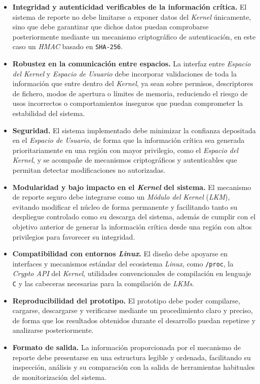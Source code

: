 \begin{itemize}
    \item \textbf{Integridad y autenticidad verificables de la información crítica.} El sistema de reporte no debe limitarse a exponer datos del \textit{Kernel} únicamente, sino que debe garantizar que dichos datos puedan comprobarse posteriormente mediante un mecanismo criptográfico de autenticación, en este caso un \textit{HMAC} basado en \texttt{SHA-256}.
    \item \textbf{Robustez en la comunicación entre espacios.} La interfaz entre \textit{Espacio del Kernel} y \textit{Espacio de Usuario} debe incorporar validaciones de toda la información que entre dentro del \textit{Kernel}, ya sean sobre permisos, descriptores de fichero, modos de apertura o límites de memoria, reduciendo el riesgo de usos incorrectos o comportamientos inseguros que puedan comprometer la estabilidad del sistema.
    \item \textbf{Seguridad.} El sistema implementado debe minimizar la confianza depositada en el \textit{Espacio de Usuario}, de forma que la información crítica sea generada prioritariamente en una región con mayor privilegio, como el \textit{Espacio del Kernel}, y se acompañe de mecanismos criptográficos y autenticables que permitan detectar modificaciones no autorizadas.
    \item \textbf{Modularidad y bajo impacto en el \textit{Kernel} del sistema.} El mecanismo de reporte seguro debe integrarse como un \textit{Módulo del Kernel} (\textit{LKM}), evitando modificar el núcleo de forma permanente y facilitando tanto su despliegue controlado como su descarga del sistema, además de cumplir con el objetivo anterior de generar la información crítica desde una región con altos privilegios para favorecer su integridad.
    \item \textbf{Compatibilidad con entornos \textit{Linux}.} El diseño debe apoyarse en interfaces y mecanismos estándar del ecosistema \textit{Linux}, como \texttt{/proc}, la \textit{Crypto API} del \textit{Kernel}, utilidades convencionales de compilación en lenguaje \texttt{C} y las cabeceras necesarias para la compilación de \textit{LKMs}.
    \item \textbf{Reproducibilidad del prototipo.} El prototipo debe poder compilarse, cargarse, descargarse y verificarse mediante un procedimiento claro y preciso, de forma que los resultados obtenidos durante el desarrollo puedan repetirse y analizarse posteriormente.
    \item \textbf{Formato de salida.} La información proporcionada por el mecanismo de reporte debe presentarse en una estructura legible y ordenada, facilitando su inspección, análisis y su comparación con la salida de herramientas habituales de monitorización del sistema.
\end{itemize}

